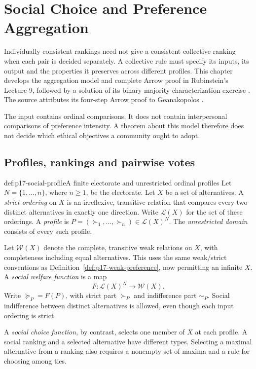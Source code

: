\chapter{Social Choice and Preference Aggregation}
\label{sec:p17-social-choice}

Individually consistent rankings need not give a consistent collective
ranking when each pair is decided separately. A collective rule must specify
its inputs, its output and the properties it preserves across different
profiles. This chapter develops the aggregation model and complete Arrow
proof in Rubinstein's Lecture 9, followed by a solution of its binary-majority
characterization exercise
\cite[2015 revision, pp.~122--128]{Rubinstein2015LectureNotes}.
The source attributes its four-step Arrow proof to Geanakopolos
\cite[p.~127]{Rubinstein2015LectureNotes}.

The input contains ordinal comparisons. It does not contain interpersonal
comparisons of preference intensity. A theorem about this model therefore
does not decide which ethical objectives a community ought to adopt.

\section{Profiles, rankings and pairwise votes}
\label{sec:p17-social-profiles}

\begin{hbdefinition}{def:p17-social-profile}{A finite electorate and unrestricted ordinal profiles}
Let \(N=\{1,\ldots,n\}\), where \(n\geq1\), be the electorate.
Let \(X\) be a set of alternatives. A \emph{strict ordering} on \(X\)
is an irreflexive, transitive relation that compares every two distinct
alternatives in exactly one direction. Write \(\mathcal L(X)\) for the
set of these orderings. A \emph{profile} is
\(P=(\succ_1,\ldots,\succ_n)\in\mathcal L(X)^N\).
The \emph{unrestricted domain} consists of every such profile.

Let \(\mathcal W(X)\) denote the complete, transitive weak relations on
\(X\), with completeness including equal alternatives. This uses the
same weak/strict conventions as Definition~\ref{def:p17-weak-preference},
now permitting an infinite \(X\). A \emph{social welfare function} is a map
\[
 F:\mathcal L(X)^N\longrightarrow\mathcal W(X).
\]
Write \(\succeq_P=F(P)\), with strict part \(\succ_P\) and indifference
part \(\sim_P\). Social indifference between distinct alternatives is
allowed, even though each input ordering is strict.

A \emph{social choice function}, by contrast, selects one member of \(X\)
at each profile. A social ranking and a selected alternative have different
types. Selecting a maximal alternative from a ranking also requires a
nonempty set of maxima and a rule for choosing among ties.
\end{hbdefinition}


